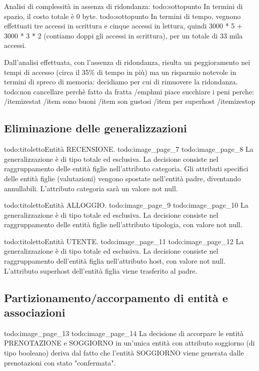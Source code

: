 Analisi di complessità in assenza di ridondanza:
{todo:sottopunto} In termini di spazio, il costo totale è 0 byte.
{todo:sottopunto} In termini di tempo, vegnono effettuati tre accessi in scrittura e cinque accessi in lettura, quindi 3000 * 5 + 3000 * 3 * 2 (contiamo doppi gli accessi in scrittura), per un totale di 33 mila accessi.

Dall'analisi effettuata, con l'assenza di ridondanza, risulta un peggioramento nei tempi di accesso (circa il 35\% di tempo in più) ma un risparmio notevole in termini di spreco di memoria: decidiamo per cui di rimuovere la ridondanza.
{todo:non cancellare perchè fatto da fratta}
/emph{mi piace succhiare i peni perche:}
/itemize{stat}
/item sono buoni
/item son gustosi
/item per superhost
/itemize{stop}

\subsection{Eliminazione delle generalizzazioni}
{todo:titoletto}Entità RECENSIONE.
{todo:image_page_7}
{todo:image_page_8}
La generalizzazione è di tipo totale ed esclusiva. 
La decisione consiste nel raggruppamento delle entità	figlie nell'attributo categoria. Gli attributi specifici delle entità figlie (valutazioni) vengono spostate nell'entità padre, diventando annullabili. L'attributo categoria sarà un valore not null.

{todo:titoletto}Entità ALLOGGIO.
{todo:image_page_9}
{todo:image_page_10}
La generalizzazione è di tipo totale ed esclusiva. La decisione consiste nel raggruppamento delle entità	figlie nell'attributo tipologia, con valore not null.

{todo:titoletto}Entità UTENTE.
{todo:image_page_11}
{todo:image_page_12}
La generalizzazione è di tipo totale ed esclusiva. La decisione consiste nel raggruppamento dell'entità figlia nell'attributo host, con valore not null. L'attributo superhost dell'entità figlia viene trasferito al padre.

\subsection{Partizionamento/accorpamento di entità e associazioni}
{todo:image_page_13}
{todo:image_page_14}
La decisione di accorpare le entità PRENOTAZIONE e SOGGIORNO in un'unica entità con attributo soggiorno (di tipo booleano) deriva dal fatto che l'entità SOGGIORNO viene generata dalle prenotazioni con stato "confermata".